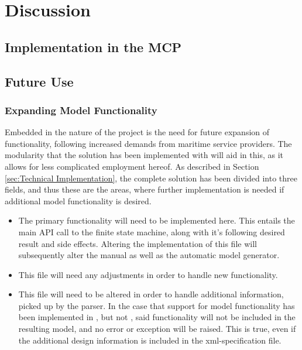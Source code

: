 \chapter{Discussion}
\section{Implementation in the MCP}

\section{Future Use}

\subsection{Expanding Model Functionality}
Embedded in the nature of the project is the need for future expansion of functionality, following increased demands from maritime service providers. The modularity that the solution has been implemented with will aid in this, as it allows for less complicated employment hereof. As described in Section \ref{sec:Technical Implementation}, the complete solution has been divided into three fields, and thus these are the areas, where further implementation is needed if additional model functionality is desired.
\begin{itemize}
  \item {}
    The primary functionality will need to be implemented here. This entails the main API call to the finite state machine, along with it's following desired result and side effects. Altering the implementation of this file will subsequently alter the manual as well as the automatic model generator.
  \item {}
    This file will  need any adjustments in order to handle new functionality.
  \item {}
    This file will need to be altered in order to handle additional information, picked up by the parser. In the case that support for model functionality has been implemented in , but not , said functionality will not be included in the resulting model, and no error or exception will be raised. This is true, even if the additional design information is included in the xml-specification file.
\end{itemize}